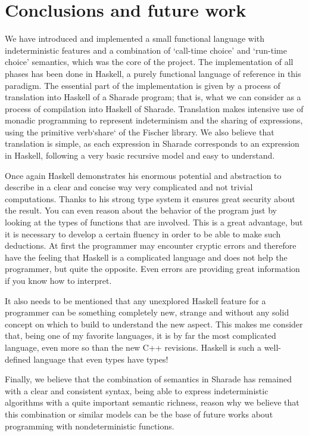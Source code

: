 \documentclass[class=article, crop=false]{standalone}
\begin{document}
\section{Conclusions and future work}
We have introduced and implemented a small functional language with indeterministic
features and a combination of `call-time choice' and `run-time choice' semantics, which was
the core of the project. The implementation of all phases has been done in Haskell, a purely
functional language of reference in this paradigm. The essential part of the implementation
is given by a process of translation into Haskell of a Sharade program; that is, what we can
consider as a process of compilation into Haskell of Sharade. Translation makes intensive use
of monadic programming to represent indeterminism and the sharing of expressions, using the
primitive verb`share` of the Fischer library. We also believe that translation is simple, as
each expression in Sharade corresponds to an expression in Haskell, following a very basic
recursive model and easy to understand.

Once again Haskell demonstrates his enormous potential and abstraction to describe in a clear
and concise way very complicated and not trivial computations. Thanks to his strong type
system it ensures great security about the result. You can even reason about the behavior of
the program just by looking at the types of functions that are involved. This is a great
advantage, but it is necessary to develop a certain fluency in order to be able to make such
deductions. At first the programmer may encounter cryptic errors and therefore have the
feeling that Haskell is a complicated language and does not help the programmer, but quite
the opposite. Even errors are providing great information if you know how to interpret.

It also needs to be mentioned that any unexplored Haskell feature for a programmer can be
something completely new, strange and without any solid concept on which to build to
understand the new aspect. This makes me consider that, being one of my favorite languages,
it is by far the most complicated language, even more so than the new C++ revisions. Haskell
is such a well-defined language that even types have types!

Finally, we believe that the combination of semantics in Sharade has remained with a clear
and consistent syntax, being able to express indeterministic algorithms with a quite
important semantic richness, reason why we believe that this combination or similar models
can be the base of future works about programming with nondeterministic functions.
\end{document}
